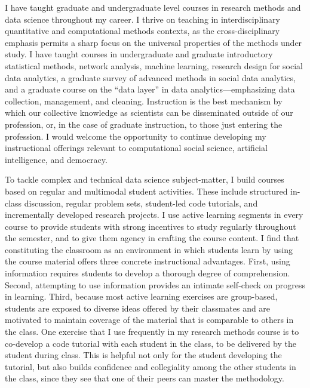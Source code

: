 \documentclass[a4paper,12pt]{article}
\begin{document}
 
\pagestyle{fancy}




I have taught graduate and undergraduate level courses in research methods and data science throughout my career. I thrive on teaching in interdisciplinary quantitative and computational methods contexts, as the cross-disciplinary emphasis permits a sharp focus on the universal properties of the methods under study. I have taught courses in undergraduate and graduate introductory statistical methods, network analysis, machine learning, research design for social data analytics, a graduate survey of advanced methods in social data analytics, and a graduate course on the ``data layer'' in data analytics---emphasizing data collection, management, and cleaning. Instruction is the best mechanism by which our collective knowledge as scientists can be disseminated outside of our profession, or, in the case of graduate instruction, to those just entering the profession. I would welcome the opportunity to continue developing my instructional offerings relevant to computational social science, artificial intelligence, and democracy.

To tackle complex and technical data science subject-matter, I build courses based on regular and multimodal student activities. These include structured in-class discussion, regular problem sets, student-led code tutorials, and incrementally developed research projects. I use active learning segments in every course to provide students with strong incentives to study regularly throughout the semester, and to give them agency in crafting the course content. I find that constituting the classroom as an environment in which students learn by using the course material offers three concrete instructional advantages. First, using information requires students to develop a thorough degree of comprehension. Second, attempting to use information provides an intimate self-check on progress in learning. Third, because most active learning exercises are group-based, students are exposed to diverse ideas offered by their classmates and are motivated to maintain coverage of the material that is comparable to others in the class. One exercise that I use frequently in my research methods course is to co-develop a code tutorial with each student in the class, to be delivered by the student during class. This is helpful not only for the student developing the tutorial, but also builds confidence and collegiality among the other students in the class, since they see that one of their peers can master the methodology. 
\end{document}

